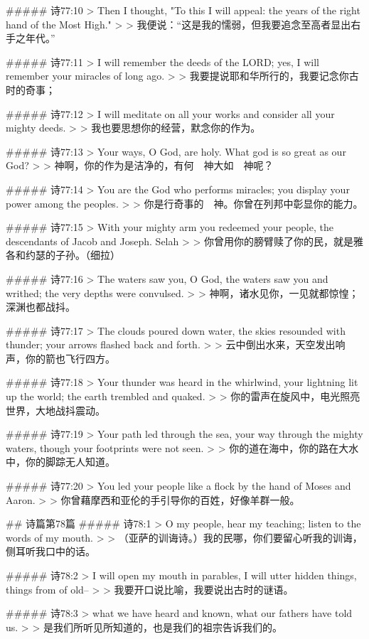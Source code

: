 ##### 诗77:10
> Then I thought, "To this I will appeal: the years of the right hand of the Most High."
>
> 我便说：“这是我的懦弱，但我要追念至高者显出右手之年代。”


##### 诗77:11
> I will remember the deeds of the LORD; yes, I will remember your miracles of long ago.
>
> 我要提说耶和华所行的，我要记念你古时的奇事；


##### 诗77:12
> I will meditate on all your works and consider all your mighty deeds.
>
> 我也要思想你的经营，默念你的作为。


##### 诗77:13
> Your ways, O God, are holy. What god is so great as our God?
>
> 神啊，你的作为是洁净的，有何　神大如　神呢？


##### 诗77:14
> You are the God who performs miracles; you display your power among the peoples.
>
> 你是行奇事的　神。你曾在列邦中彰显你的能力。


##### 诗77:15
> With your mighty arm you redeemed your people, the descendants of Jacob and Joseph. Selah
>
> 你曾用你的膀臂赎了你的民，就是雅各和约瑟的子孙。（细拉）


##### 诗77:16
> The waters saw you, O God, the waters saw you and writhed; the very depths were convulsed.
>
> 神啊，诸水见你，一见就都惊惶；深渊也都战抖。


##### 诗77:17
> The clouds poured down water, the skies resounded with thunder; your arrows flashed back and forth.
>
> 云中倒出水来，天空发出响声，你的箭也飞行四方。


##### 诗77:18
> Your thunder was heard in the whirlwind, your lightning lit up the world; the earth trembled and quaked.
>
> 你的雷声在旋风中，电光照亮世界，大地战抖震动。


##### 诗77:19
> Your path led through the sea, your way through the mighty waters, though your footprints were not seen.
>
> 你的道在海中，你的路在大水中，你的脚踪无人知道。


##### 诗77:20
> You led your people like a flock by the hand of Moses and Aaron.
>
> 你曾藉摩西和亚伦的手引导你的百姓，好像羊群一般。


## 诗篇第78篇
##### 诗78:1
> O my people, hear my teaching; listen to the words of my mouth.
>
> （亚萨的训诲诗。）我的民哪，你们要留心听我的训诲，侧耳听我口中的话。


##### 诗78:2
> I will open my mouth in parables, I will utter hidden things, things from of old--
>
> 我要开口说比喻，我要说出古时的谜语。


##### 诗78:3
> what we have heard and known, what our fathers have told us.
>
> 是我们所听见所知道的，也是我们的祖宗告诉我们的。


